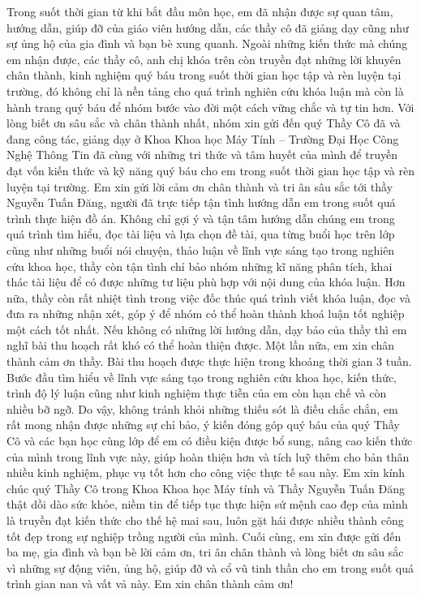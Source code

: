  
 
\begin{acknowledgements}      

Trong suốt thời gian từ khi bắt đầu môn học, em đã nhận được sự quan tâm, hướng dẫn, giúp đỡ của giáo viên hướng dẫn, các thầy cô đã giảng dạy cũng như sự ủng hộ của gia đình và bạn bè xung quanh. Ngoài những kiến thức mà chúng em nhận được, các thầy cô, anh chị khóa trên còn truyền đạt những lời khuyên chân thành, kinh nghiệm quý báu trong suốt thời gian học tập và rèn luyện tại trường, đó không chỉ là nền tảng cho quá trình nghiên cứu khóa luận mà còn là hành trang quý báu để nhóm bước vào đời một cách vững chắc và tự tin hơn.
Với lòng biết ơn sâu sắc và chân thành nhất, nhóm xin gửi đến quý Thầy Cô đã và đang công tác, giảng dạy ở Khoa Khoa học Máy Tính – Trường Đại Học Công Nghệ Thông Tin đã cùng với những tri thức và tâm huyết của mình để truyền đạt vốn kiến thức và kỹ năng quý báu cho em trong suốt thời gian học tập và rèn luyện tại trường.
Em xin gửi lời cảm ơn chân thành và tri ân sâu sắc tới thầy Nguyễn Tuấn Đăng, người đã trực tiếp tận tình hướng dẫn em trong suốt quá trình thực hiện đồ án. Không chỉ gợi ý và tận tâm hướng dẫn chúng em trong quá trình tìm hiểu, đọc tài liệu và lựa chọn đề tài, qua từng buổi học trên lớp cũng như những buổi nói chuyện, thảo luận về lĩnh vực sáng tạo trong nghiên cứu khoa học, thầy còn tận tình chỉ bảo nhóm những kĩ năng phân tích, khai thác tài liệu để có được những tư liệu phù hợp với nội dung của khóa luận. Hơn nữa, thầy còn rất nhiệt tình trong việc đốc thúc quá trình viết khóa luận, đọc và đưa ra những nhận xét, góp ý để nhóm có thể hoàn thành khoá luận tốt nghiệp một cách tốt nhất. Nếu không có những lời hướng dẫn, dạy bảo của thầy thì em nghĩ bài thu hoạch rất khó có  thể hoàn thiện được. Một lần nữa, em xin chân thành cảm ơn thầy.
Bài thu hoạch được thực hiện trong khoảng thời gian 3 tuần. Bước đầu tìm hiểu về lĩnh vực sáng tạo trong nghiên cứu khoa học, kiến thức, trình độ lý luận cũng như kinh nghiệm thực tiễn của em còn hạn chế và còn nhiều bỡ ngỡ. Do vậy, không tránh khỏi những thiếu sót là điều chắc chắn, em rất mong nhận được những sự chỉ bảo, ý kiến đóng góp quý báu của quý Thầy Cô và các bạn học cùng lớp để em có điều kiện được bổ sung, nâng cao kiến thức của mình trong lĩnh vực này, giúp hoàn thiện hơn và tích luỹ thêm cho bản thân nhiều kinh nghiệm, phục vụ tốt hơn cho công việc thực tế sau này.
Em xin kính chúc quý Thầy Cô trong Khoa Khoa học Máy tính và Thầy Nguyễn Tuấn Đăng thật dồi dào sức khỏe, niềm tin để tiếp tục thực hiện sứ mệnh cao đẹp của mình là truyền đạt kiến thức cho thế hệ mai sau, luôn gặt hái được nhiều thành công tốt đẹp trong sự nghiệp trồng người của mình.
Cuối cùng, em xin được gửi đến ba mẹ, gia đình và bạn bè lời cảm ơn, tri ân chân thành và lòng biết ơn sâu sắc vì những sự động viên, ủng hộ, giúp đỡ và cổ vũ tinh thần cho em trong suốt quá trình gian nan và vất vả này.
Em xin chân thành cảm ơn!


\end{acknowledgements}
  